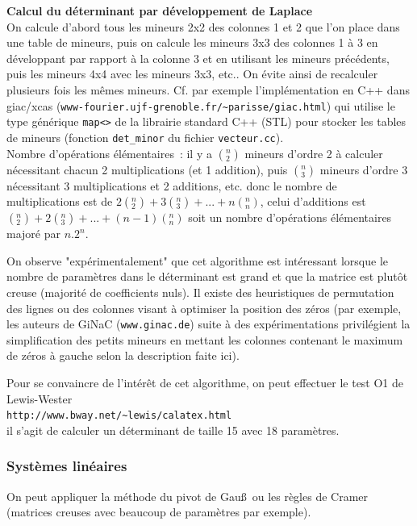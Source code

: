 \documentclass[a4paper,11pt]{article}
\begin{document}
{\bf Calcul du déterminant par développement de Laplace}\\
On calcule d'abord tous les mineurs 2x2 des colonnes 1 et 2
que l'on place dans une table de mineurs,
puis on calcule les mineurs 3x3 des colonnes 1 \`a 3 en développant
par rapport à la colonne 3 et en utilisant les mineurs pr\'ec\'edents,
puis les mineurs 4x4 avec les mineurs 3x3, etc.. 
On évite ainsi de recalculer plusieurs fois les mêmes mineurs.
Cf. par exemple l'implémentation en C++ dans giac/xcas
(\verb|www-fourier.ujf-grenoble.fr/~parisse/giac.html|)
qui utilise le type générique \verb|map<>| de la librairie standard C++ (STL)
pour stocker les tables de mineurs (fonction 
\verb|det_minor| du fichier {\tt vecteur.cc}).\\
Nombre d'opérations élémentaires~: il y a $(^n_2)$ mineurs d'ordre 2
à calculer nécessitant chacun 2 multiplications (et 1 addition),
puis $(^n_3)$ mineurs d'ordre 3 nécessitant 3 multiplications et
2 additions, etc. donc le nombre de multiplications est de
$2(^n_2)+3(^n_3)+...+n(^n_n)$, celui d'additions est
$(^n_2)+2(^n_3)+...+(n-1)(^n_n)$ soit un nombre d'opérations
élémentaires majoré par $n.2^n$.

On observe "expérimentalement" que cet algorithme est intéressant
lorsque le nombre de
paramètres dans le déterminant est grand et que la matrice est
plutôt creuse (majorité de coefficients nuls). Il existe des
heuristiques de permutation des lignes ou des colonnes visant
à optimiser la position des zéros (par exemple, les auteurs de GiNaC
(\verb|www.ginac.de|) suite à des expérimentations
privilégient la simplification des petits mineurs en mettant les colonnes 
contenant le maximum de z\'eros \`a gauche selon la description faite
ici). 

Pour se convaincre de l'int\'er\^et de cet algorithme, on peut effectuer
le test O1 de Lewis-Wester\\
\verb|http://www.bway.net/~lewis/calatex.html|\\
il s'agit de calculer un d\'eterminant de taille 15 avec 18 param\`etres.

\subsubsection{Syst\`emes lin\'eaires}
On peut appliquer la m\'ethode du pivot de Gau\ss\ ou les r\`egles
de Cramer (matrices creuses avec beaucoup de param\`etres par exemple). 
\end{document}
